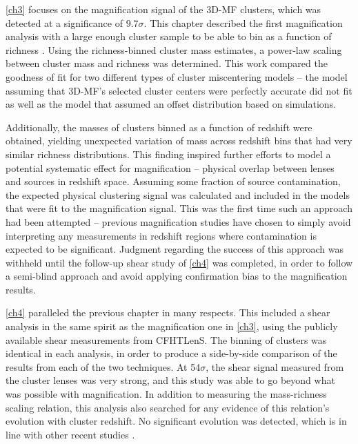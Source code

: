 \autoref{ch3} focuses on the magnification signal of the \ac{3D-MF} clusters, which was detected at a significance of $9.7\sigma$. This chapter described the first magnification analysis with a large enough cluster sample to be able to bin as a function of richness \citep[however, note that the publication of this work was followed in quick succession by a very interesting magnification study of clusters and luminous red galaxies in the \ac{SDSS} by][]{Bauer14}. Using the richness-binned cluster mass estimates, a power-law scaling between cluster mass and richness was determined. This work compared the goodness of fit for two different types of cluster miscentering models -- the model assuming that \ac{3D-MF}'s selected cluster centers were perfectly accurate did not fit as well as the model that assumed an offset distribution based on simulations.

Additionally, the masses of clusters binned as a function of redshift were obtained, yielding unexpected variation of mass across redshift bins that had very similar richness distributions. This finding inspired further efforts to model a potential systematic effect for magnification -- physical overlap between lenses and sources in redshift space. Assuming some fraction of source contamination, the expected physical clustering signal was calculated and included in the models that were fit to the magnification signal. This was the first time such an approach had been attempted -- previous magnification studies have chosen to simply avoid interpreting any measurements in redshift regions where contamination is expected to be significant. Judgment regarding the success of this approach was withheld until the follow-up shear study of \autoref{ch4} was completed, in order to follow a semi-blind approach and avoid applying confirmation bias to the magnification results.

\autoref{ch4} paralleled the previous chapter in many respects. This included a shear analysis in the same spirit as the magnification one in \autoref{ch3}, using the publicly available shear measurements from \ac{CFHTLenS}. The binning of clusters was identical in each analysis, in order to produce a side-by-side comparison of the results from each of the two techniques. At 54$\sigma$, the shear signal measured from the cluster lenses was very strong, and this study was able to go beyond what was possible with magnification. In addition to measuring the mass-richness scaling relation, this analysis also searched for any evidence of this relation's evolution with cluster redshift. No significant evolution was detected, which is in line with other recent studies \citep{Andreon14}. 

